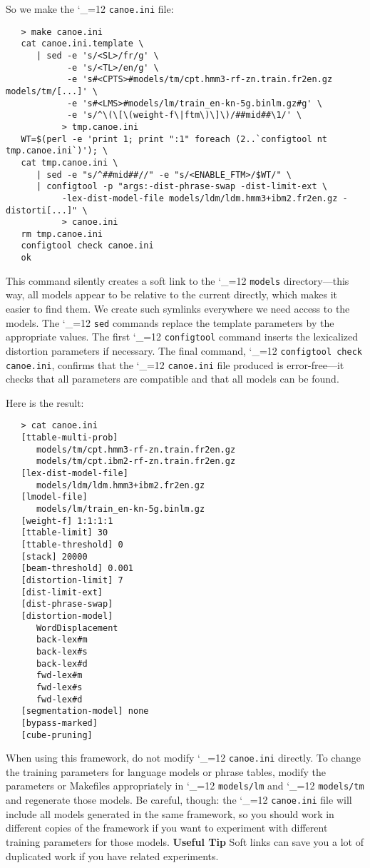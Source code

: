 \documentclass[11pt,letterpaper]{article}
\def\code{\begingroup\catcode`\_=12 \codex}
\newcommand{\codex}[1]{\texttt{#1}\endgroup}
\newcommand{\tip}{\textbf{Useful Tip \large{\ding{43}} }}
\newcommand{\margintip}{\marginpar[{\textbf{Tip \large{\ding{43}}}}]{\textbf{\reflectbox{\large{\ding{43}}} Tip}}}
\newcommand{\tipend}{\textbf{ \reflectbox{\large{\ding{43}}}}}
\begin{document}
So we make the \code{canoe.ini} file:
\begin{small}
\begin{verbatim}
   > make canoe.ini
   cat canoe.ini.template \
      | sed -e 's/<SL>/fr/g' \
            -e 's/<TL>/en/g' \
            -e 's#<CPTS>#models/tm/cpt.hmm3-rf-zn.train.fr2en.gz models/tm/[...]' \
            -e 's#<LMS>#models/lm/train_en-kn-5g.binlm.gz#g' \
            -e 's/^\(\[\(weight-f\|ftm\)\]\)/##mid##\1/' \
           > tmp.canoe.ini
   WT=$(perl -e 'print 1; print ":1" foreach (2..`configtool nt tmp.canoe.ini`)'); \
   cat tmp.canoe.ini \
      | sed -e "s/^##mid##//" -e "s/<ENABLE_FTM>/$WT/" \
      | configtool -p "args:-dist-phrase-swap -dist-limit-ext \
           -lex-dist-model-file models/ldm/ldm.hmm3+ibm2.fr2en.gz -distorti[...]" \
           > canoe.ini
   rm tmp.canoe.ini
   configtool check canoe.ini
   ok
\end{verbatim}
\end{small}
This command silently creates a soft link to the \code{models} directory---this
way, all models appear to be relative to the current directly, which makes it easier
to find them.  We create such symlinks everywhere we need access to the
models.  The \code{sed} commands replace the template parameters by the
appropriate values.  The first \code{configtool} command inserts the lexicalized
distortion parameters if necessary.  The final command, \code{configtool
check canoe.ini}, confirms that the \code{canoe.ini} file produced is
error-free---it checks that all parameters are compatible and that all models
can be found.

Here is the result:
\begin{small}
\begin{verbatim}
   > cat canoe.ini
   [ttable-multi-prob] 
      models/tm/cpt.hmm3-rf-zn.train.fr2en.gz
      models/tm/cpt.ibm2-rf-zn.train.fr2en.gz
   [lex-dist-model-file] 
      models/ldm/ldm.hmm3+ibm2.fr2en.gz
   [lmodel-file] 
      models/lm/train_en-kn-5g.binlm.gz
   [weight-f] 1:1:1:1
   [ttable-limit] 30
   [ttable-threshold] 0
   [stack] 20000
   [beam-threshold] 0.001
   [distortion-limit] 7
   [dist-limit-ext]
   [dist-phrase-swap]
   [distortion-model] 
      WordDisplacement
      back-lex#m
      back-lex#s
      back-lex#d
      fwd-lex#m
      fwd-lex#s
      fwd-lex#d
   [segmentation-model] none
   [bypass-marked]
   [cube-pruning]
\end{verbatim}
\end{small}

When using this framework, do not modify \code{canoe.ini} directly.  To
change the training parameters for language models or phrase tables, modify the
parameters or Makefiles appropriately in \code{models/lm} and
\code{models/tm} and regenerate those models. Be careful, though: the
\code{canoe.ini} file will include all models generated in the same
framework, so you should work in different copies of the framework if you want
to experiment with different training parameters for those models. 
\tip\margintip Soft links can save you a lot of duplicated work if you have
related experiments.\tipend
\end{document}
